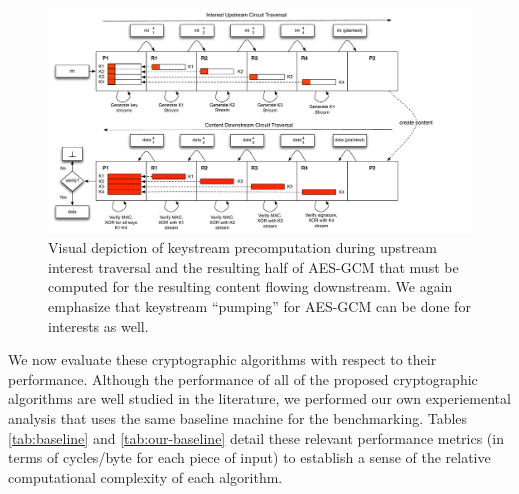 \documentclass[10pt]{article}
\begin{document}
\begin{figure}[ht!]
\begin{center}
\includegraphics[scale=0.45]{./images/ctr_split.pdf}
\end{center}
\caption{Visual depiction of keystream precomputation during upstream interest traversal and the resulting half of AES-GCM that must be computed for the resulting content flowing downstream. We again emphasize that keystream ``pumping'' for AES-GCM can be done for interests as well.}
\label{fig:circuit}
\end{figure}

We now evaluate these cryptographic algorithms with respect to their performance. Although the performance of all of the proposed cryptographic algorithms are well studied in the literature, we performed our own experiemental analysis that uses the same baseline machine for the benchmarking. Tables \ref{tab:baseline} and \ref{tab:our-baseline} detail these relevant performance metrics (in terms of cycles/byte for each piece of input) to establish a sense of the relative computational complexity of each algorithm.
\end{document}
